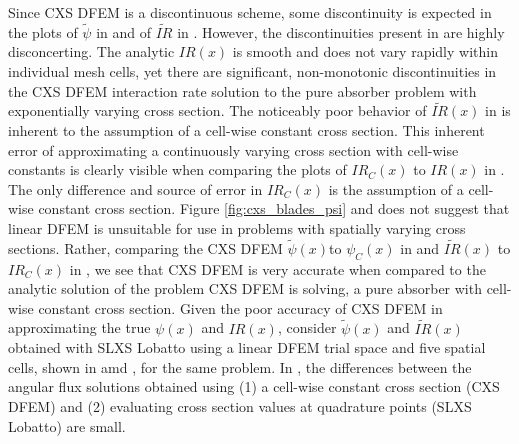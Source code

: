 Since CXS DFEM is a discontinuous scheme, some discontinuity is expected in the plots of $\widetilde{\psi}$ in  and of $\widetilde{IR}$ in . 
However, the discontinuities present in  are highly disconcerting.
The analytic $IR(x)$ is smooth and does not vary rapidly within individual mesh cells, yet there are significant, non-monotonic discontinuities in the CXS DFEM interaction rate solution to the pure absorber problem with exponentially varying cross section.
The noticeably poor behavior of $\widetilde{IR}(x)$ in  is inherent to the assumption of a cell-wise constant cross section.
This inherent error of approximating a continuously varying cross section with cell-wise constants is clearly visible when comparing the plots of $IR_C(x)$ to $IR(x)$ in .
The only difference and source of error in $IR_C(x)$ is the assumption of a cell-wise constant cross section.
Figure \ref{fig:cxs_blades_psi} and  does not suggest that linear DFEM is unsuitable for use in problems with spatially varying cross sections. 
Rather, comparing the CXS DFEM $\widetilde{\psi}(x)$to $\psi_C(x)$ in  and $\widetilde{IR}(x)$ to $IR_C(x)$ in , we see that CXS DFEM  is very accurate when compared to the analytic solution of the problem CXS DFEM is solving, a pure absorber with cell-wise constant cross section.
%
Given the poor accuracy of CXS DFEM in approximating the true $\psi(x)$ and $IR(x)$, consider $\widetilde{\psi}(x)$ and $\widetilde{IR}(x)$ obtained with SLXS Lobatto using a linear DFEM trial space and five spatial cells, shown in  amd , for the same problem.  
In , the differences between the angular flux solutions obtained using (1) a cell-wise constant cross section (CXS DFEM) and (2) evaluating cross section values at quadrature points (SLXS Lobatto) are small.
